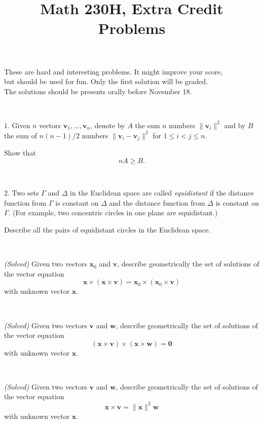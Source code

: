 \documentclass{article}
\def\noi{\noindent}%
\def\ge{\geqslant}%
\def\le{\leqslant}%
\begin{document}
\title{Math 230H, Extra Credit Problems}
\author{}
\date{}
\maketitle

\begin{center}
{\small These are hard and interesting problems.
It might improve your score,\\
but should be used for fun. 
Only the first solution will be graded. 
\\ The solutions should 
be presents orally before November 18.}
\end{center}
\thispagestyle{empty}

\ 

\noi $1$. 
Given $n$ vectors $\mathbf{v}_1,\dots,\mathbf{v}_n$, 
denote by $A$ the sum $n$ numbers $\|\mathbf{v}_i\|^2$
and by $B$ the sum of $n(n-1)/2$ numbers 
$\|\mathbf{v}_i-\mathbf{v}_j\|^2$ for $1\le i<j\le n$.

Show that 
\[n A\ge B.\]

\ 

\noi
$2$. 
Two sets $\Gamma$ and $\Delta$ in the Euclidean space 
are called \emph{equidistant} if the distance function from $\Gamma$ is constant on $\Delta$ and the distance function from $\Delta$ is constant on $\Gamma$.
(For example, two concentric circles in one plane are equidistant.)

Describe all the pairs of equidistant circles in the Euclidean space.

\ 

\noi
{}\textit{(Solved)}  
Given two vectors $\mathbf{x}_0$ and $\mathbf{v}$,
describe geometrically the set of solutions of the vector equation
\[\mathbf{x}\times(\mathbf{x}\times\mathbf{v})=\mathbf{x}_0\times(\mathbf{x}_0\times\mathbf{v})\]
with unknown vector  $\mathbf{x}$.

\ 

\noi
{}\textit{(Solved)} 
Given two vectors $\mathbf{v}$ and $\mathbf{w}$,
describe geometrically the set of solutions of the vector equation
\[(\mathbf{x}\times\mathbf{v})\times(\mathbf{x}\times\mathbf{w})=\mathbf{0}\]
with unknown vector  $\mathbf{x}$.

\ 

\noi{}\textit{(Solved)}
Given two vectors $\mathbf{v}$ and $\mathbf{w}$,
describe geometrically the set of solutions of the vector equation
\[\mathbf{x}\times\mathbf{v}=\|\mathbf{x}\|^2\mathbf{w}\]
with unknown vector  $\mathbf{x}$.
\end{document}
